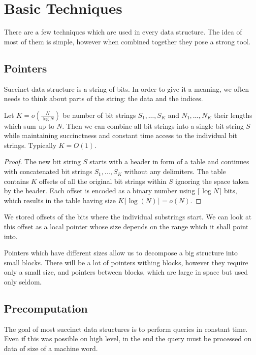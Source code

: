 \section{Basic Techniques}

There are a few techniques which are used in every data structure.
The idea of most of them is simple, however when combined together they pose a strong tool.

\subsection{Pointers}

Succinct data structure is a string of bits.
In order to give it a meaning, we often needs to think about parts of the string: the data and the indices.

\begin{lemma}
	Let $K = o(\frac{N}{\log N})$ be number of bit strings $S_1, \ldots, S_K$ and $N_1, \dots, N_K$ their lengths which sum up to $N$.
	Then we can combine all bit strings into a single bit string $S$ while maintaining succinctness and constant time access to the individual bit strings.
	Typically $K = O(1)$.
\end{lemma}
\begin{proof}
	The new bit string $S$ starts with a header in form of a table and continues with concatenated bit strings $S_1, \ldots, S_K$ without any delimiters.
	The table contains $K$ offsets of all the original bit strings within $S$ ignoring the space taken by the header.
	Each offset is encoded as a binary number using $\lceil \log N \rceil$ bits, which results in the table having size $K \lceil \log (N) \rceil = o(N)$.
\end{proof}

We stored offsets of the bits where the individual substrings start.
We can look at this offset as a local pointer whose size depends on the range which it shall point into.

Pointers which have different sizes allow us to decompose a big structure into small blocks.
There will be a lot of pointers withing blocks, however they require only a small size, and pointers between blocks, which are large in space but used only seldom.

\subsection{Precomputation}

The goal of most succinct data structures is to perform queries in constant time.
Even if this was possible on high level, in the end the query must be processed on data of size of a machine word.

